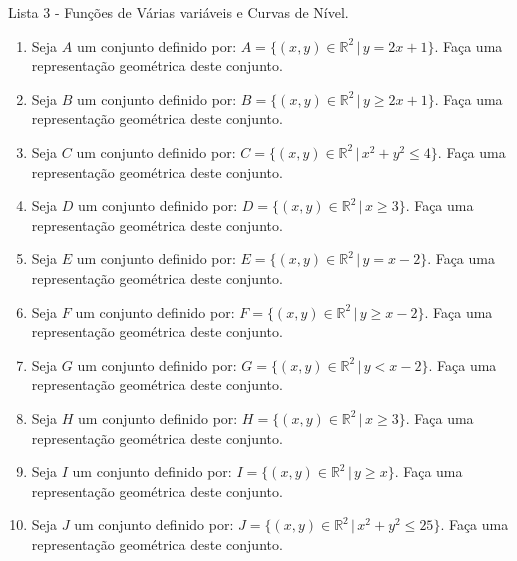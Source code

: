 \documentclass[11pt,a4paper]{article}
\begin{document}
\begin{center}
		\Large Lista 3 - Funções de Várias variáveis e Curvas de Nível.
	\end{center}

\begin{enumerate}

\item Seja $A$ um conjunto definido por: $A = \{(x,y) \in \mathbb{R}^2 \,|\, y = 2x + 1\}$. Faça uma representação geométrica deste conjunto.

\item Seja $B$ um conjunto definido por: $B = \{(x,y) \in \mathbb{R}^2 \,|\, y \geq 2x + 1\}$. Faça uma representação geométrica deste conjunto.

\item Seja $C$ um conjunto definido por: $C = \{(x,y) \in \mathbb{R}^2 \,|\, x^2 + y^2 \leq 4 \}$. Faça uma representação geométrica deste conjunto.

\item Seja $D$ um conjunto definido por: $D = \{(x,y) \in \mathbb{R}^2 \,|\, x \geq 3 \}$. Faça uma representação geométrica deste conjunto.

\item Seja $E$ um conjunto definido por: $E = \{(x,y) \in \mathbb{R}^2 \,|\, y = x - 2 \}$. Faça uma representação geométrica deste conjunto.

\item Seja $F$ um conjunto definido por: $F = \{(x,y) \in \mathbb{R}^2 \,|\, y \geq x - 2 \}$. Faça uma representação geométrica deste conjunto.

\item Seja $G$ um conjunto definido por: $G = \{(x,y) \in \mathbb{R}^2 \,|\, y < x - 2 \}$. Faça uma representação geométrica deste conjunto.

\item Seja $H$ um conjunto definido por: $H = \{(x,y) \in \mathbb{R}^2 \,|\, x \geq 3 \}$. Faça uma representação geométrica deste conjunto.








\item Seja $I$ um conjunto definido por: $I = \{(x,y) \in \mathbb{R}^2 \,|\, y \geq x \}$. Faça uma representação geométrica deste conjunto.

\item Seja $J$ um conjunto definido por: $J = \{(x,y) \in \mathbb{R}^2 \,|\, x^2 + y^2 \leq 25 \}$. Faça uma representação geométrica deste conjunto.


\end{enumerate}
\end{document}

